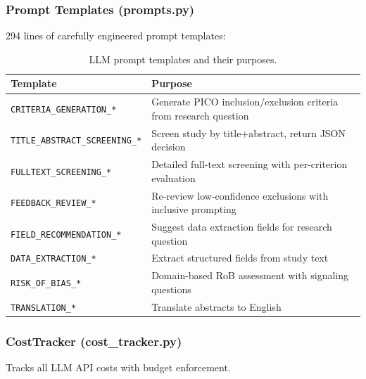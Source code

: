\documentclass[11pt,a4paper]{article}
\begin{document}
\subsubsection{Prompt Templates (prompts.py)}

294 lines of carefully engineered prompt templates:

\begin{table}[H]
\centering\small
\begin{tabular}{lp{8cm}}
\toprule
\textbf{Template} & \textbf{Purpose} \\
\midrule
\texttt{CRITERIA\_GENERATION\_*} & Generate PICO inclusion/exclusion criteria from research question \\
\texttt{TITLE\_ABSTRACT\_SCREENING\_*} & Screen study by title+abstract, return JSON decision \\
\texttt{FULLTEXT\_SCREENING\_*} & Detailed full-text screening with per-criterion evaluation \\
\texttt{FEEDBACK\_REVIEW\_*} & Re-review low-confidence exclusions with inclusive prompting \\
\texttt{FIELD\_RECOMMENDATION\_*} & Suggest data extraction fields for research question \\
\texttt{DATA\_EXTRACTION\_*} & Extract structured fields from study text \\
\texttt{RISK\_OF\_BIAS\_*} & Domain-based RoB assessment with signaling questions \\
\texttt{TRANSLATION\_*} & Translate abstracts to English \\
\bottomrule
\end{tabular}
\caption{LLM prompt templates and their purposes.}
\end{table}

\subsubsection{CostTracker (cost\_tracker.py)}

Tracks all LLM API costs with budget enforcement.
\end{document}
